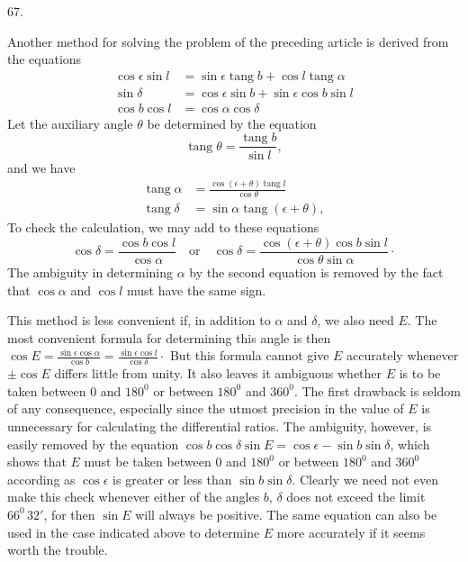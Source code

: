 \par\medskip
\hypertarget{native-086-article067}{}
\begin{center}67.\end{center}
Another method for solving the problem of the preceding article is derived from the equations\HistoricalNoteEight{Manuscript note:]
\[
\begin{aligned}
\sin\alpha\cos\delta&=-\sin\epsilon\sin b+\cos\epsilon\cos b\sin l\\[.35em]
\cos\alpha\cos\delta&=\cos b\cos l\\[.35em]
\sin\delta&=\cos\epsilon\sin b+\sin\epsilon\cos b\sin l.
\end{aligned}
\]
}
\[
\begin{aligned}
\cos\epsilon\sin l&=\sin\epsilon\operatorname{tang}b+\cos l\operatorname{tang}\alpha\\[.4em]
\sin\delta&=\cos\epsilon\sin b+\sin\epsilon\cos b\sin l\\[.4em]
\cos b\cos l&=\cos\alpha\cos\delta
\end{aligned}
\]
Let the auxiliary angle $\theta$ be determined by the equation
\[
\operatorname{tang}\theta=\frac{\operatorname{tang}b}{\sin l},
\]
and we have
\[
\begin{aligned}
\operatorname{tang}\alpha&=\frac{\cos(\epsilon+\theta)\operatorname{tang}l}{\cos\theta}\\[.6em]
\operatorname{tang}\delta&=\sin\alpha\operatorname{tang}(\epsilon+\theta),
\end{aligned}
\]
To check the calculation, we may add to these equations
\[
\cos\delta=\frac{\cos b\cos l}{\cos\alpha}\quad\text{or}\quad
\cos\delta=\frac{\cos(\epsilon+\theta)\cos b\sin l}{\cos\theta\sin\alpha}\cdot
\]
The ambiguity in determining $\alpha$ by the second equation is removed by the fact that $\cos\alpha$ and $\cos l$ must have the same sign.

This method is less convenient if, in addition to $\alpha$ and $\delta$, we also need $E$. The most convenient formula for determining this angle is then $\cos E=\frac{\sin\epsilon\cos\alpha}{\cos b}=\frac{\sin\epsilon\cos l}{\cos\delta}\cdot$ But this formula cannot give $E$ accurately whenever $\pm\cos E$ differs little from unity. It also leaves it ambiguous whether $E$ is to be taken between $0$ and $180^0$ or between $180^0$ and $360^0$. The first drawback is seldom of any consequence, especially since the utmost precision in the value of $E$ is unnecessary for calculating the differential ratios. The ambiguity, however, is easily removed by the equation $\cos b\cos\delta\sin E=\cos\epsilon-\sin b\sin\delta$, which shows that $E$ must be taken between $0$ and $180^0$ or between $180^0$ and $360^0$ according as $\cos\epsilon$ is greater or less than $\sin b\sin\delta$. Clearly we need not even make this check whenever either of the angles $b$, $\delta$ does not exceed the limit $66^0\,32'$, for then $\sin E$ will always be positive. The same equation can also be used in the case indicated above to determine $E$ more accurately if it seems worth the trouble.
